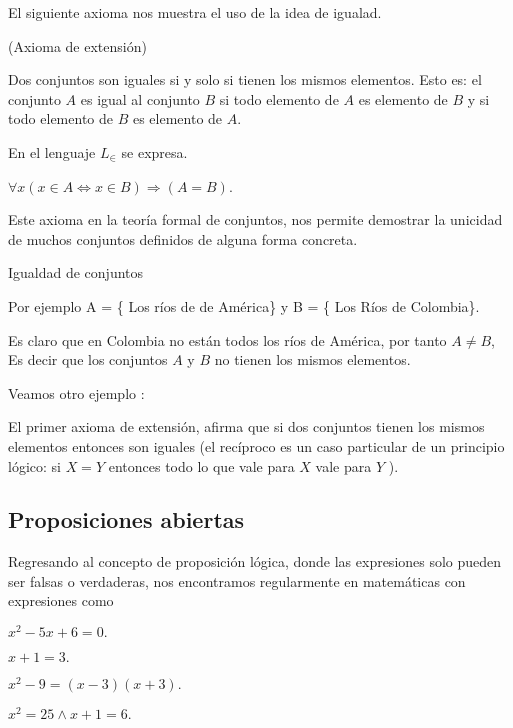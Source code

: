\vspace{30pt}

El siguiente axioma nos muestra el uso de la idea de igualad. 

\vspace*{30pt}\begin{axioma}{ (Axioma de extensión)}{}\label{A1}

Dos conjuntos son iguales si y solo si tienen los mismos elementos.
Esto es: el conjunto $A$ es igual al conjunto $B$ si todo elemento
de $A$ es elemento de $B$ y si todo elemento de $B$ es elemento
de $A$. 

En el lenguaje $L_{\in}$ se expresa.

$\forall x(x\in A\Leftrightarrow x\in B)\Rightarrow\left(A=B\right)$.
\end{axioma}

Este axioma en la teoría formal de conjuntos, nos permite demostrar
la unicidad de muchos conjuntos definidos de alguna forma concreta. 

\begin{ejemplo}{ Igualdad de conjuntos }

Por ejemplo A = \{ Los ríos de de América\} y B = \{ Los Ríos de Colombia\}.

Es claro que en Colombia no están todos los ríos de América, por tanto
$A\neq B$, Es decir que los conjuntos $A$ y $B$ no tienen los mismos
elementos.\end{ejemplo}

Veamos otro ejemplo :

El primer axioma de extensión, afirma que si dos conjuntos tienen
los mismos elementos entonces son iguales (el recíproco es un caso
particular de un principio lógico: si $X=Y$ entonces todo lo que
vale para $X$ vale para $Y$ ).

\subsection{Proposiciones abiertas}

Regresando al concepto de proposición lógica, donde las expresiones
solo pueden ser falsas o verdaderas, nos encontramos regularmente
en matemáticas con expresiones como 

\begin{lista}

\item $x^{2}-5x+6=0.$

\item $x+1=3.$

\item $x^{2}-9=\left(x-3\right)\left(x+3\right).$

\item $x^{2}=25\wedge x+1=6.$

\end{lista}


